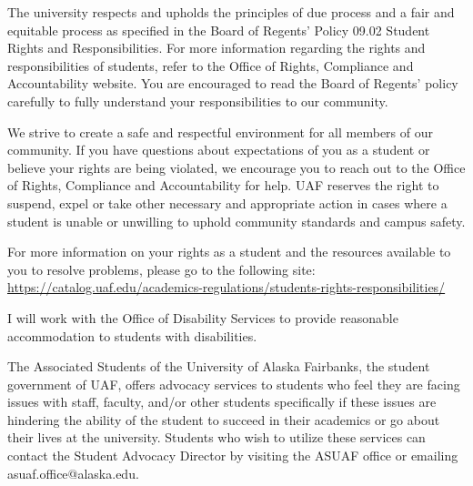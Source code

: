 \documentclass[11pt]{article}
\begin{document}
 The university respects and upholds the principles of due process and a fair and equitable process as specified in the Board of Regents' Policy 09.02 Student Rights and Responsibilities. For more information regarding the rights and responsibilities of students, refer to the Office of Rights, Compliance and Accountability website. You are encouraged to read the Board of Regents' policy carefully to fully understand your responsibilities to our community.

We strive to create a safe and respectful environment for all members of our community. If you have questions about expectations of you as a student or believe your rights are being violated, we encourage you to reach out to the  Office of Rights, Compliance and Accountability for help. UAF reserves the right to suspend, expel or take other necessary and appropriate action in cases where a student is unable or unwilling to uphold community standards and campus safety.

For more information on your rights as a student and the resources available to you to resolve problems, please go to the following site:\\ \url{https://catalog.uaf.edu/academics-regulations/students-rights-responsibilities/}

 I will work with the Office of Disability Services to provide reasonable accommodation to students with disabilities.

 The Associated Students of the University of Alaska Fairbanks, the student government of UAF, offers advocacy services to students who feel they are facing issues with staff, faculty, and/or other students specifically if these issues are hindering the ability of the student to succeed in their academics or go about their lives at the university. Students who wish to utilize these services can contact the Student Advocacy Director by visiting the ASUAF office or emailing asuaf.office@alaska.edu. 
\end{document}
